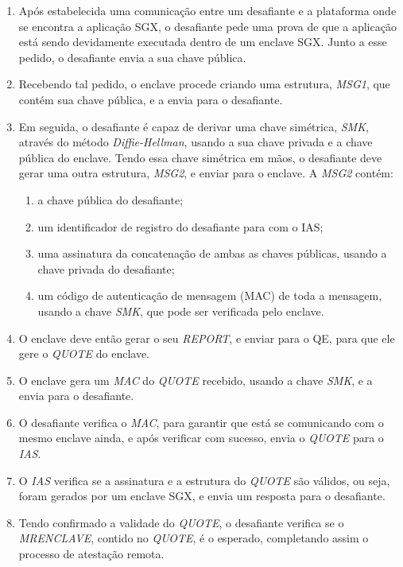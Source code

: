 \begin{enumerate}
    \item Após estabelecida uma comunicação entre um desafiante e a plataforma
    onde se encontra a aplicação SGX, o desafiante pede
    uma prova de que a aplicação está sendo devidamente executada dentro de um
    enclave SGX. Junto a esse pedido, o desafiante envia a sua chave pública.

    \item Recebendo tal pedido, o enclave procede criando uma estrutura,
    \textit{MSG1}, que contém sua chave pública, e a envia para o desafiante.

    \item Em seguida, o desafiante é capaz de derivar uma chave
    simétrica, \textit{SMK}, através do método \textit{Diffie-Hellman}, usando a
    sua chave privada e a chave pública do enclave. Tendo essa chave simétrica
    em mãos, o desafiante deve gerar uma outra estrutura, \textit{MSG2}, e
    enviar para o enclave. A \textit{MSG2} contém:
    \begin{enumerate}
        \item a chave pública do desafiante;
        \item um identificador de registro do desafiante para com o IAS;
        \item uma assinatura da concatenação de ambas as chaves públicas, usando
        a chave privada do desafiante;
        \item um código de autenticação de mensagem (MAC) de toda a mensagem,
        usando a chave \textit{SMK}, que pode ser verificada pelo enclave.
    \end{enumerate}

    \item O enclave deve então gerar o seu \textit{REPORT}, e enviar para o QE,
    para que ele gere o \textit{QUOTE} do enclave.

    \item O enclave gera um \textit{MAC} do \textit{QUOTE} recebido, usando a
    chave \textit{SMK}, e a envia para o desafiante.

    \item O desafiante verifica o \textit{MAC}, para garantir que está se
    comunicando com o mesmo enclave ainda, e após verificar com sucesso, envia o
    \textit{QUOTE} para o \textit{IAS}.

    \item O \textit{IAS} verifica se a assinatura e a estrutura do \textit{QUOTE}
    são válidos, ou seja, foram gerados por um enclave SGX, e envia um resposta
    para o desafiante.

    \item Tendo confirmado a validade do \textit{QUOTE}, o desafiante verifica
    se o \textit{MRENCLAVE}, contido no \textit{QUOTE}, é o esperado,
    completando assim o processo de atestação remota.

\end{enumerate}

